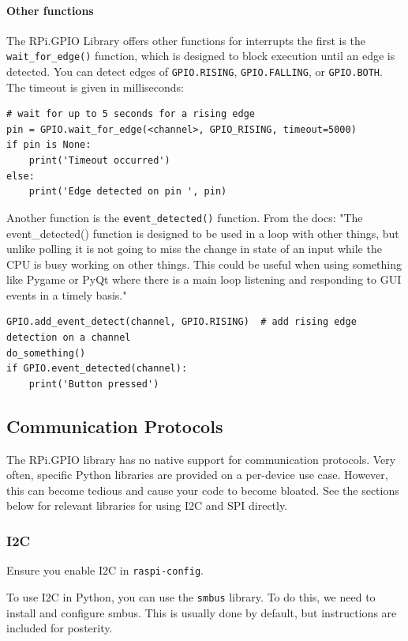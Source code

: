 \paragraph{Other functions}
The RPi.GPIO Library offers other functions for interrupts the first is the \verb|wait_for_edge()| function, which is designed to block execution until an edge is detected. You can detect edges of \verb|GPIO.RISING|, \verb|GPIO.FALLING|, or \verb|GPIO.BOTH|. The timeout is given in milliseconds:
\begin{lstlisting}
# wait for up to 5 seconds for a rising edge
pin = GPIO.wait_for_edge(<channel>, GPIO_RISING, timeout=5000)
if pin is None:
    print('Timeout occurred')
else:
    print('Edge detected on pin ', pin)
\end{lstlisting}

Another function is the \verb|event_detected()| function. From the docs: "The event\_detected() function is designed to be used in a loop with other things, but unlike polling it is not going to miss the change in state of an input while the CPU is busy working on other things. This could be useful when using something like Pygame or PyQt where there is a main loop listening and responding to GUI events in a timely basis."

\begin{lstlisting}
GPIO.add_event_detect(channel, GPIO.RISING)  # add rising edge detection on a channel
do_something()
if GPIO.event_detected(channel):
    print('Button pressed')
\end{lstlisting}

\subsection{Communication Protocols}
The RPi.GPIO library has no native support for communication protocols. Very often, specific Python libraries are provided on a per-device use case. However, this can become tedious and cause your code to become bloated. See the sections below for relevant libraries for using I2C and SPI directly.

\subsubsection{I2C}
Ensure you enable I2C in \verb|raspi-config|.

To use I2C in Python, you can use the \verb|smbus| library. To do this, we need to install and configure smbus. This is usually done by default, but instructions are included for posterity.

